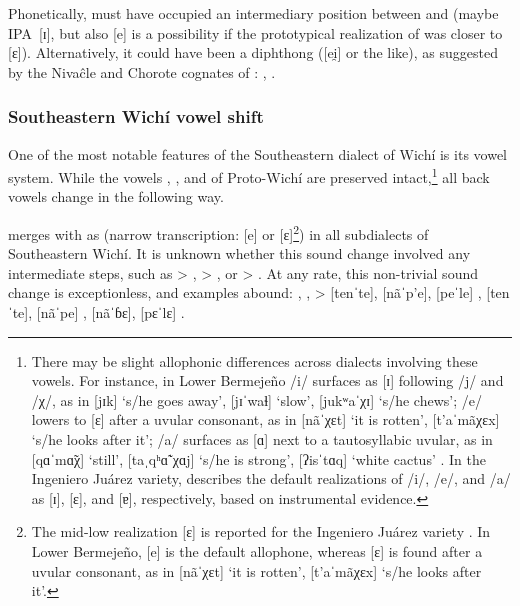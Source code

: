 Phonetically,  must have occupied an intermediary position between  and  (maybe IPA~[ɪ], but also [e] is a possibility if the prototypical realization of  was closer to [ɛ]). Alternatively, it could have been a diphthong ([ei̯] or the like), as suggested by the Nivaĉle and Chorote cognates of : , .

\subsubsection{Southeastern Wichí vowel shift}\label{wi-vowel-shift}

One of the most notable features of the Southeastern dialect of Wichí is its vowel system. While the vowels , , and  of Proto-Wichí are preserved intact,\footnote{There may be slight allophonic differences across dialects involving these vowels. For instance, in Lower Bermejeño /i/ surfaces as [ɪ] following /j/ and /χ/, as in [jɪk] `s/he goes away', [jɪˈwaɬ] `slow', [jukʷaˈχɪ] `s/he chews'; /e/ lowers to [ɛ] after a uvular consonant, as in [nãˈχɛt] `it is rotten', [t’aˈmãχɛx] `s/he looks after it'; /a/ surfaces as [ɑ] next to a tautosyllabic uvular, as in [qɑˈmɑ̃χ] `still', [taˌqʰɑ̃ˈχɑj] `s/he is strong', [ʔisˈtɑq] `white cactus' \citep[41]{VN14}. In the Ingeniero Juárez variety, \citet[362]{LCB15} describes the default realizations of /i/, /e/, and /a/ as [ɪ], [ɛ], and [ɐ], respectively, based on instrumental evidence.} all back vowels change in the following way.

 merges with  as  (narrow transcription: [e] or [ɛ]\footnote{The mid-low realization [ɛ] is reported for the Ingeniero Juárez variety \citep[362]{LCB15}. In Lower Bermejeño, [e] is the default allophone, whereas [ɛ] is found after a uvular consonant, as in [nãˈχɛt] `it is rotten', [t’aˈmãχɛx] `s/he looks after it'.}) in all subdialects of Southeastern Wichí. It is unknown whether this sound change involved any intermediate steps, such as  > ,  > , or  > . At any rate, this non-trivial sound change is exceptionless, and examples abound: , ,  >  [tenˈte],  [nãˈp’e],  [peˈle] \citep[161, 278, 459]{VN14},  [tenˈte],  [nãˈpe] \citep[25, 37]{JT09-th},  [nãˈɓɛ],  [pɛˈlɛ] \citep[367]{LCB15}.

